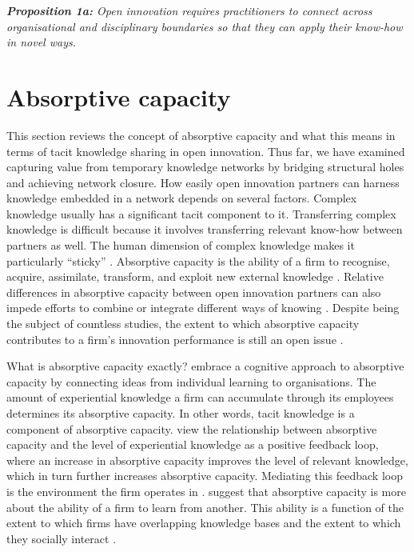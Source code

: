 \begin{tcolorbox}
\textit{\textbf{Proposition 1a:} Open  innovation  requires  practitioners  to  connect across organisational and disciplinary boundaries so that they can apply their know-how in novel ways.}
\end{tcolorbox}

\section{Absorptive capacity} 

This section reviews the concept of absorptive capacity and what this means in terms of tacit knowledge sharing in open innovation. Thus far, we have examined capturing value from temporary knowledge networks by bridging structural holes and achieving network closure. How easily open innovation partners can harness knowledge embedded in a network depends on several factors. Complex knowledge usually has a significant tacit component to it. Transferring complex knowledge is difficult because it involves transferring relevant know-how between partners as well. The human dimension of complex knowledge makes it particularly \enquote{sticky} \citep{von1994sticky,szulanski2003sticky}. Absorptive capacity is the ability of a firm to recognise, acquire, assimilate, transform, and exploit new external knowledge \citep{cohen1990absorptive}. Relative differences in absorptive capacity between open innovation partners can also impede efforts to combine or integrate different ways of knowing \citep{vanhaverbeke2007connecting,lichtenthaler2016absorptive}. Despite being the subject of countless studies, the extent to which absorptive capacity contributes to a firm's innovation performance is still an open issue \citep{omidvar2013revisiting,duchek2013capturing}. \medskip

What is absorptive capacity exactly? \citet{cohen1990absorptive} embrace a cognitive approach to absorptive capacity by connecting ideas from individual learning to organisations. The amount of experiential knowledge a firm can accumulate through its employees determines its absorptive capacity. In other words, tacit knowledge is a component of absorptive capacity. \citet{cohen1990absorptive} view the relationship between absorptive capacity and the level of experiential knowledge as a positive feedback loop, where an increase in absorptive capacity improves the level of relevant knowledge, which in turn further increases absorptive capacity. Mediating this feedback loop is the environment the firm operates in \citep{van1999coevolution}. \citet{lane1998relative} suggest that absorptive capacity is more about the ability of a firm to learn from another. This ability is a function of the extent to which firms have overlapping knowledge bases and the extent to which they socially interact \citep{dyer1998relational,nooteboom2000learning}. \medskip

